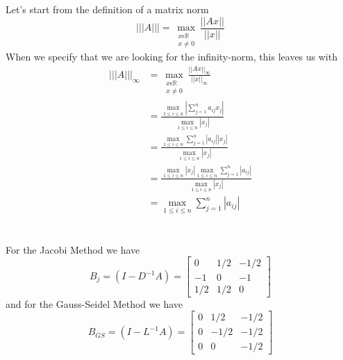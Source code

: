 \documentclass{article}
\begin{document}
\section{}
Let's start from the definition of a matrix norm
\[|||A||| = \underset{\substack{x\epsilon\mathbb{R}\\ x\neq0}}{\max}
\frac{||Ax||}{||x||}\]
When we specify that we are looking for the infinity-norm, this leaves
us with
\begin{align*}
  |||A|||_{\infty} &= \underset{\substack{x\epsilon\mathbb{R}\\ x\neq0}}{\max}
  \frac{||Ax||_{\infty}}{||x||_{\infty}}\\
  &= \frac{\underset{1\leq i \leq n}{\max}\left|\sum\limits^n_{j=1}a_{ij}x_j\right|}
       {\underset{1\leq i \leq n}{\max} \left|x_j\right|}\\
  &= \frac{\underset{1\leq i \leq n}{\max}\sum\limits^n_{j=1}\left|a_{ij}\right|\left|x_j\right|}
       {\underset{1\leq i \leq n}{\max} \left|x_j\right|}\\
  &= \frac{\underset{1\leq i \leq n}{\max} \left|x_j\right|\underset{1\leq i \leq n}{\max}\sum\limits^n_{j=1}\left|a_{ij}\right|}
       {\underset{1\leq i \leq n}{\max} \left|x_j\right|}\\
  &= \underset{1\leq i \leq n}{\max}\sum\limits^n_{j=1}\left|a_{ij}\right|
\end{align*}

\section{}
\subsection{}
\subsubsection{}
For the Jacobi Method we have
\[B_j = (I-D^{-1}A) =
\begin{bmatrix}
  0  &  1/2  &  -1/2\\
  -1 &   0   &   -1\\
  1/2&  1/2  &    0
\end{bmatrix}
\]
and for the Gauss-Seidel Method we have
\[B_{GS} = (I-L^{-1}A) =
\begin{bmatrix}
  0  &  1/2  & -1/2\\
  0  & -1/2  & -1/2\\
  0  &   0   & -1/2
\end{bmatrix}
\]
\end{document}
